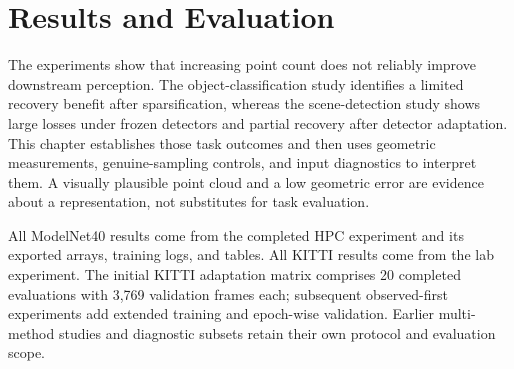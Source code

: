 \chapter{Results and Evaluation}
\label{chap:results}

The experiments show that increasing point count does not reliably improve
downstream perception. The object-classification study identifies a limited
recovery benefit after sparsification, whereas the scene-detection study
shows large losses under frozen detectors and partial recovery after detector
adaptation. This chapter establishes those task outcomes and then uses
geometric measurements, genuine-sampling controls, and input diagnostics to
interpret them. A visually plausible point cloud and a low geometric error
are evidence about a representation, not substitutes for task evaluation.

All ModelNet40 results come from the completed HPC experiment and its
exported arrays, training logs, and tables. All KITTI results come from
the lab experiment. The initial KITTI adaptation matrix comprises 20 completed
evaluations with 3,769 validation frames each; subsequent observed-first
experiments add extended training and epoch-wise validation. Earlier multi-method studies
and diagnostic subsets retain their own protocol and evaluation scope.




